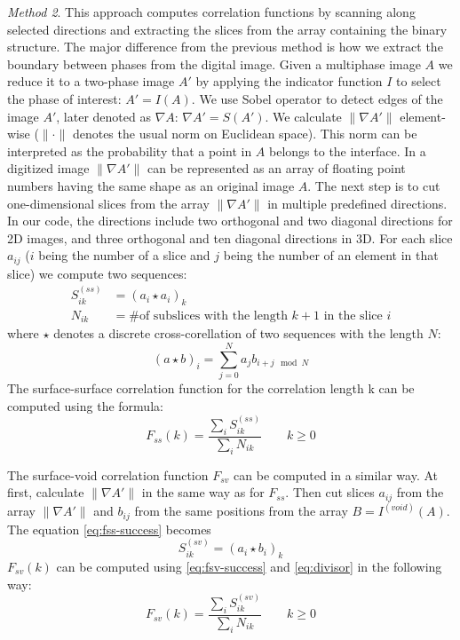 \documentclass[reprint,amsmath,amssymb,aps,pre]{revtex4-1}
\begin{document}
\textit{Method 2}. This approach computes correlation functions by scanning
along selected directions and extracting the slices from the array containing
the binary structure. The major difference from the previous method is how we
extract the boundary between phases from the digital image. Given a multiphase
image $A$ we reduce it to a two-phase image $A'$ by applying the indicator
function $I$ to select the phase of interest: $A' = I(A)$. We use Sobel operator
to detect edges of the image $A'$, later denoted as $\nabla A$:
$\nabla A' = S(A')$. We calculate $\|\nabla A'\|$ element-wise ($\|\cdot\|$
denotes the usual norm on Euclidean space). This norm can be interpreted as the
probability that a point in $A$ belongs to the interface. In a digitized image
$\|\nabla A'\|$ can be represented as an array of floating point numbers having
the same shape as an original image $A$. The next step is to cut one-dimensional
slices from the array $\|\nabla A' \|$ in multiple predefined directions. In our
code, the directions include two orthogonal and two diagonal directions for 2D
images, and three orthogonal and ten diagonal directions in 3D. For each slice
$a_{ij}$ ($i$ being the number of a slice and $j$ being the number of an element
in that slice) we compute two sequences:
\begin{align}
  S^{(ss)}_{ik} &= (a_i \star a_i)_k \label{eq:fss-success} \\
  N_{ik} &= \text{\# of subslices with the length $k+1$ in the slice $i$} \label{eq:divisor}
\end{align}
where $\star$ denotes a discrete cross-corellation of two sequences with the
length $N$:
\begin{equation*}
  (a\star b)_i = \sum_{j=0}^N a_j b_{i+j \mod N}
\end{equation*}
The surface-surface correlation function for the correlation length k can be
computed using the formula:
\begin{equation*}
  F_{ss}(k) = \frac{\sum_i S^{(ss)}_{ik}}{\sum_i N_{ik}} \qquad k \ge 0
\end{equation*}

The surface-void correlation function $F_{sv}$ can be computed in a similar
way. At first, calculate $\|\nabla A'\|$ in the same way as for $F_{ss}$. Then
cut slices $a_{ij}$ from the array $\|\nabla A'\|$  and $b_{ij}$ from the same
positions from the array $B = I^{(void)}(A)$. The equation \cref{eq:fss-success}
becomes
\begin{equation}
  S^{(sv)}_{ik} = (a_i \star b_i)_k \label{eq:fsv-success}
\end{equation}
$F_{sv}(k)$ can be computed using \cref{eq:fsv-success} and \cref{eq:divisor} in
the following way:
\begin{equation*}
  F_{sv}(k) = \frac{\sum_i S^{(sv)}_{ik}}{\sum_i N_{ik}} \qquad k \ge 0
\end{equation*}
\end{document}
